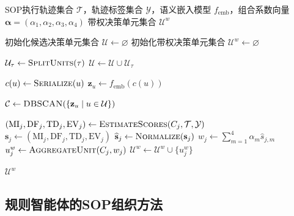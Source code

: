 \begin{algorithm}[!t]
    \caption{\enspace 决策单元提取、对齐与加权算法}
    \label{alg:decision_unit_weighting}
    \begin{algorithmic}[1]
        \Require SOP执行轨迹集合 $\mathcal{T}$，轨迹标签集合 $\mathcal{Y}$，语义嵌入模型 $f_{\mathrm{emb}}$，组合系数向量 $\boldsymbol{\alpha}=(\alpha_1,\alpha_2,\alpha_3,\alpha_4)$
        \Ensure 带权决策单元集合 $\mathcal{U}^{w}$
        
        \State 初始化候选决策单元集合 $\mathcal{U}\leftarrow \varnothing$
        \State 初始化带权决策单元集合 $\mathcal{U}^{w}\leftarrow \varnothing$
        
            \State $\mathcal{U}_{\tau}\leftarrow \textsc{SplitUnits}(\tau)$ 
            \State $\mathcal{U}\leftarrow \mathcal{U}\cup \mathcal{U}_{\tau}$
        \EndFor
        
            \State $c(u)\leftarrow \textsc{Serialize}(u)$ 
            \State $\mathbf{z}_{u}\leftarrow f_{\mathrm{emb}}(c(u))$ 
        \EndFor
        
        \State $\mathcal{C}\leftarrow \textsc{DBSCAN}(\{\mathbf{z}_{u}\mid u\in\mathcal{U}\})$ 
        
            \State $(\mathrm{MI}_{j},\mathrm{DF}_{j},\mathrm{TD}_{j},\mathrm{EV}_{j})\leftarrow \textsc{EstimateScores}(C_j,\mathcal{T},\mathcal{Y})$
            \State $\mathbf{s}_{j}\leftarrow (\mathrm{MI}_{j},\mathrm{DF}_{j},\mathrm{TD}_{j},\mathrm{EV}_{j})$
            \State $\widehat{\mathbf{s}}_{j}\leftarrow \textsc{Normalize}(\mathbf{s}_{j})$ 
            \State $w_{j}\leftarrow \sum_{m=1}^{4}\alpha_{m}\widehat{s}_{j,m}$ 
            \State $u_{j}^{w}\leftarrow \textsc{AggregateUnit}(C_j,w_j)$ 
            \State $\mathcal{U}^{w}\leftarrow \mathcal{U}^{w}\cup\{u_{j}^{w}\}$
        \EndFor
        
        \State \Return $\mathcal{U}^{w}$
    \end{algorithmic}
\end{algorithm}


\subsection{规则智能体的SOP组织方法}

